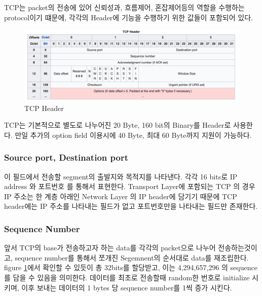     TCP는 packet의 전송에 있어 신뢰성과, 흐름제어, 혼잡제어등의 역할을 수행하는 protocol이기 떄문에, 각각의 Header에 기능을 수행하기 위한 값들이 포함되어 있다. \\
    \vspace{-4mm}  
        \begin{figure}[!h]\centering
    		\includegraphics[width=.9\textwidth]{image/week01/1-2.png}
    		\caption{\small TCP Header}
    		\label{fig:TCP}
    		\vspace{-10pt}
        \end{figure}

    TCP는 기본적으로 별도로 나누어진 20 Byte, 160 bit의 Binary를 Header로 사용한다.  
    만일 추가의 option field 이용시에 40 Byte, 최대 60 Byte까지 지원이 가능하다. 
\newpage
    \subsubsection*{Source port, Destination port}
        이 필드에서 전송할 segment의 출발지와 목적지를 나타낸다. 
        각각 16 bits로 IP address 와 포트번호 를 통해서 표현한다. 
        Transport Layer에 포함되는 TCP 의 경우 IP 주소는 한 계층 아래인  Network Layer 의 IP header에 담기기 때문에 TCP header에는 IP 주소를 나타내는 필드가 없고 포트번호만을 나타내는 필드만 존재한다.
    \subsubsection*{Sequence Number}
        앞서 TCP의 base가 전송하고자 하는 data를 각각의 packet으로 나누어 전송하는것이고, sequence number를 통해서 쪼개진 Segemnent의  순서대로 data를 재조립한다. 
        figure \ref{fig:TCP}에서 확인할 수 있듯이 총 32bits를 할당받고, 이는 4,294,657,296 의 sequence를 담을 수 있음을 의미한다. 데이터를 최초로 전송할때 random한 번호로 initialize 시키며, 이후 보내는 데이터의 1 bytes 당 sequence number를 1씩 증가 시킨다.
